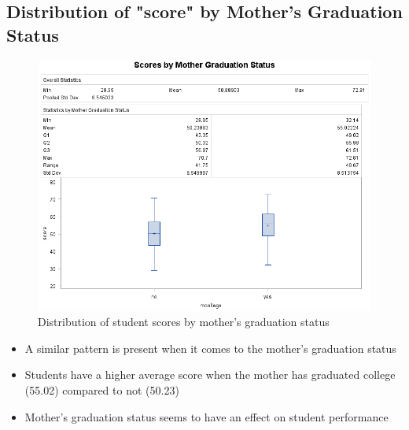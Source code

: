\documentclass[12pt]{article}
\begin{document}
\subsection{Distribution of "score" by Mother's Graduation Status}
\begin{figure}[h]
    \centering
    \includegraphics[width=1.14\textwidth]{images/scores_by_mcollege.png}
    \caption{Distribution of student scores by mother's graduation status}
    \label{scores_by_mcollege}
\end{figure}

\begin{itemize}
    \item A similar pattern is present when it comes to the mother's graduation status
    \item Students have a higher average score when the mother has graduated college (55.02) compared to not (50.23)
    \item Mother's graduation status seems to have an effect on student performance
\end{itemize}
\newpage
\end{document}
